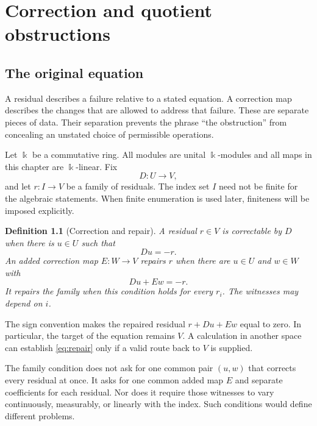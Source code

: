 \documentclass[11pt,letterpaper,oneside,openany]{book}
\theoremstyle{quiet}
\newtheorem{definition}[theorem]{Definition}
\newcommand{\kk}{\Bbbk}
\begin{document}
\clearpage
\tableofcontents

\chapter{Correction and quotient obstructions}\label{ch:basic}
\section{The original equation}
A residual describes a failure relative to a stated equation. A correction map describes the changes that are allowed to address that failure. These are separate pieces of data. Their separation prevents the phrase ``the obstruction'' from concealing an unstated choice of permissible operations.

Let $\kk$ be a commutative ring. All modules are unital $\kk$-modules and all maps in this chapter are $\kk$-linear. Fix
\[
D:U\longrightarrow V,
\]
and let $r:I\to V$ be a family of residuals. The index set $I$ need not be finite for the algebraic statements. When finite enumeration is used later, finiteness will be imposed explicitly.

\begin{definition}[Correction and repair]\label{def:repair}
A residual $r\in V$ is \emph{correctable} by $D$ when there is $u\in U$ such that
\begin{equation}\label{eq:correct}
Du=-r.
\end{equation}
An added correction map $E:W\to V$ \emph{repairs} $r$ when there are $u\in U$ and $w\in W$ with
\begin{equation}\label{eq:repair}
Du+Ew=-r.
\end{equation}
It repairs the family when this condition holds for every $r_i$. The witnesses may depend on $i$.
\end{definition}

The sign convention makes the repaired residual $r+Du+Ew$ equal to zero. In particular, the target of the equation remains $V$. A calculation in another space can establish \eqref{eq:repair} only if a valid route back to $V$ is supplied.

The family condition does not ask for one common pair $(u,w)$ that corrects every residual at once. It asks for one common added map $E$ and separate coefficients for each residual. Nor does it require those witnesses to vary continuously, measurably, or linearly with the index. Such conditions would define different problems.
\end{document}
